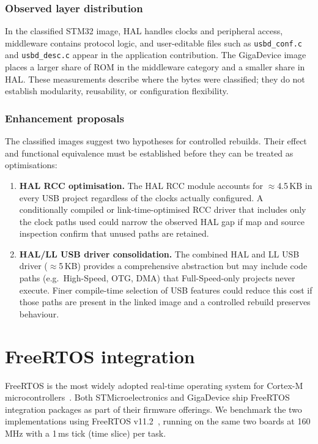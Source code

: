 \subsubsection*{Observed layer distribution}
In the classified STM32 image, HAL handles clocks and peripheral access, middleware contains
protocol logic, and user-editable files such as \texttt{usbd\_conf.c} and
\texttt{usbd\_desc.c} appear in the application contribution. The GigaDevice image places a
larger share of ROM in the middleware category and a smaller share in HAL. These measurements
describe where the bytes were classified; they do not establish modularity, reusability, or
configuration flexibility.

\subsubsection*{Enhancement proposals}
The classified images suggest two hypotheses for controlled rebuilds. Their effect and
functional equivalence must be established before they can be treated as optimisations:

\begin{enumerate}
  \item \textbf{HAL RCC optimisation.} The HAL RCC module accounts for $\approx$4.5\,KB in
    every USB project regardless of the clocks actually configured. A conditionally compiled
    or link-time-optimised RCC driver that includes only the clock paths used could narrow
    the observed HAL gap if map and source inspection confirm that unused paths are retained.
  \item \textbf{HAL/LL USB driver consolidation.} The combined HAL and LL USB driver
    ($\approx$5\,KB) provides a comprehensive abstraction but may include code paths
    (e.g.\ High-Speed, OTG, DMA) that Full-Speed-only projects never execute. Finer
    compile-time selection of USB features could reduce this cost if those paths are present
    in the linked image and a controlled rebuild preserves behaviour.
\end{enumerate}

\section{FreeRTOS integration}
\label{sec:gd32-freertos}

FreeRTOS is the most widely adopted real-time operating system for Cortex-M
microcontrollers~\cite{freertos}. Both STMicroelectronics and GigaDevice ship FreeRTOS
integration packages as part of their firmware offerings. We benchmark the two
implementations using FreeRTOS v11.2~\cite{freertos-v11}, running on the same two boards
at 160\,MHz with a 1\,ms tick (time slice) per task.

